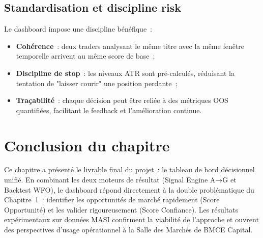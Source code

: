 \subsection{Standardisation et discipline risk}

Le dashboard impose une discipline bénéfique~:
\begin{itemize}
    \item \textbf{Cohérence}~: deux traders analysant le même titre avec la même
    fenêtre temporelle arrivent au même score de base~;
    \item \textbf{Discipline de stop}~: les niveaux ATR sont pré-calculés, réduisant
    la tentation de "laisser courir" une position perdante~;
    \item \textbf{Traçabilité}~: chaque décision peut être reliée à des métriques
    OOS quantifiées, facilitant le feedback et l'amélioration continue.
\end{itemize}

\section*{Conclusion du chapitre}

Ce chapitre a présenté le livrable final du projet~: le tableau de bord décisionnel
unifié. En combinant les deux moteurs de résultat (Signal Engine A→G et Backtest WFO),
le dashboard répond directement à la double problématique du Chapitre~1~: identifier
les opportunités de marché rapidement (Score Opportunité) et les valider rigoureusement
(Score Confiance). Les résultats expérimentaux sur données MASI confirment la viabilité
de l'approche et ouvrent des perspectives d'usage opérationnel à la Salle des Marchés
de BMCE Capital.
